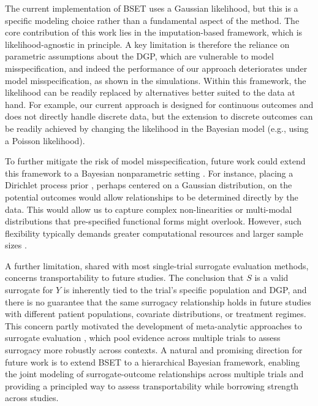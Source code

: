 \documentclass[referee,usenatbib]{biom}
\begin{document}
The current implementation of BSET uses a Gaussian likelihood, but this is a specific modeling choice rather than a fundamental aspect of the method. The core contribution of this work lies in the imputation-based framework, which is likelihood-agnostic in principle. A key limitation is therefore the reliance on parametric assumptions about the DGP, which are vulnerable to model misspecification, and indeed the performance of our approach deteriorates under model misspecification, as shown in the simulations. Within this framework, the likelihood can be readily replaced by alternatives better suited to the data at hand. For example, our current approach is designed for continuous outcomes and does not directly handle discrete data, but the extension to discrete outcomes can be readily achieved by changing the likelihood in the Bayesian model (e.g., using a Poisson likelihood). 

To further mitigate the risk of model misspecification, future work could extend this framework to a Bayesian nonparametric setting \citep{ghosal2017fundamentals}. For instance, placing a Dirichlet process prior \citep{ferguson1973bayesian}, perhaps centered on a Gaussian distribution, on the potential outcomes would allow relationships to be determined directly by the data. This would allow us to capture complex non-linearities or multi-modal distributions that pre-specified functional forms might overlook. However, such flexibility typically demands greater computational resources and larger sample sizes \citep{miller2018mixture}.

A further limitation, shared with most single-trial surrogate evaluation methods, concerns transportability to future studies. The conclusion that \(S\) is a valid surrogate for \(Y\) is inherently tied to the trial's specific population and DGP, and there is no guarantee that the same surrogacy relationship holds in future studies with different patient populations, covariate distributions, or treatment regimes. This concern partly motivated the development of meta-analytic approaches to surrogate evaluation \citep{buyse1998criteria,burzykowski2005evaluation}, which pool evidence across multiple trials to assess surrogacy more robustly across contexts. A natural and promising direction for future work is to extend BSET to a hierarchical Bayesian framework, enabling the joint modeling of surrogate-outcome relationships across multiple trials and providing a principled way to assess transportability while borrowing strength across studies.
\end{document}
